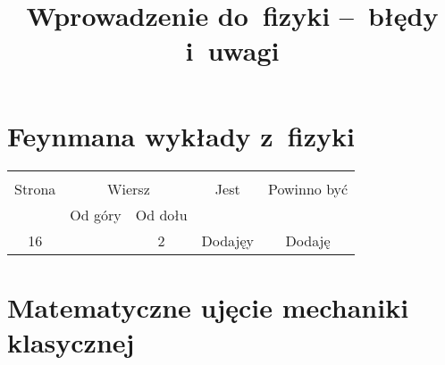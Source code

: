 \documentclass[a4paper,11pt]{article}
\title{Wprowadzenie do~fizyki --~błędy i~uwagi}
\begin{document}



\maketitle %



\section{Feynmana wykłady z~fizyki}

\vspace{\spaceTwo}




\begin{center}
  \begin{tabular}{|c|c|c|c|c|}
    \hline
    & \multicolumn{2}{c|}{} & & \\
    Strona & \multicolumn{2}{c|}{Wiersz} & Jest
                              & Powinno być \\ \cline{2-3}
    & Od góry & Od dołu & & \\
    \hline
    16  & &  2 & Dodajęy & Dodaję \\
    \hline
  \end{tabular}
\end{center}

\vspace{\spaceTwo}





\newpage
\section{Matematyczne ujęcie mechaniki klasycznej}
\end{document}
